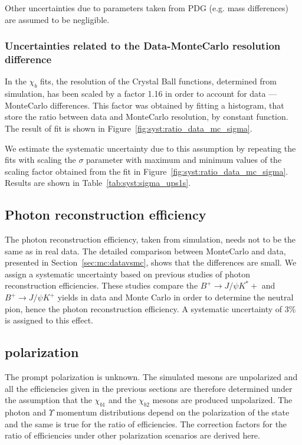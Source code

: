 Other uncertainties due to parameters taken from PDG (e.g. mass differences)
are assumed to be negligible.

\subsubsection{Uncertainties related to the Data-MonteCarlo resolution difference}

In the $\chi_b$ fits, the resolution of the Crystal Ball functions, determined
from simulation, has been scaled by a factor 1.16 in order to account for data ---
MonteCarlo differences. This factor was obtained by fitting a histogram, 
that store the ratio between data and MonteCarlo resolution, by constant function.
The result of fit is shown in Figure~\ref{fig:syst:ratio_data_mc_sigma}.




We estimate the systematic uncertainty due to this assumption by repeating the
fits with scaling the $\sigma$ parameter with maximum and minimum values of
the scaling factor obtained from the fit in Figure~\ref{fig:syst:ratio_data_mc_sigma}.
Results are shown in Table~\ref{tab:syst:sigma_ups1s}.



\subsection{Photon reconstruction efficiency}
The photon reconstruction efficiency, taken from simulation, needs not to be
the same as in real data. The detailed comparison between MonteCarlo and data,
presented in Section~\ref{sec:mc:datavsmc}, shows that the differences
are small. We assign a systematic uncertainty based on previous studies of
photon reconstruction efficiencies. These studies compare the $B^+ \rightarrow
J/\psi K^*+$ and $B^+ \rightarrow J/\psi K^+$ yields in data and Monte Carlo in
order to determine the neutral pion, hence the photon  reconstruction
efficiency. A systematic uncertainty of 3\% is assigned to this effect.






\subsection{\chib polarization}
\label{sec:syst:pol}

The prompt \chib polarization is unknown. The simulated \chib mesons are
unpolarized and all the efficiencies given in the previous sections are
therefore determined under the assumption that the $\chi_{b1}$ and the
$\chi_{b2}$ mesons are produced unpolarized. The photon and $\Upsilon$ momentum
distributions depend on the polarization of the \chib state and the same is
true for the ratio of efficiencies. The correction factors for the ratio of
efficiencies under other polarization scenarios are derived here.

